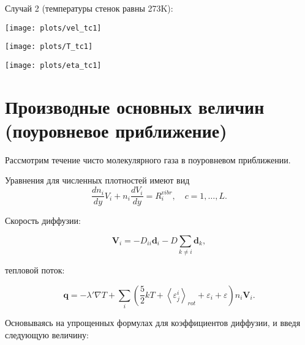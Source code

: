 \documentclass[12pt]{article}
\begin{document}
Случай 2 (температуры стенок равны 273K):
\begin{center}
\texttt{[image: plots/vel\_tc1]}
\end{center}
\begin{center}
\texttt{[image: plots/T\_tc1]}
\end{center}
\begin{center}
\texttt{[image: plots/eta\_tc1]}
\end{center}

\section{Производные основных величин (поуровневое приближение)}
Рассмотрим течение чисто молекулярного газа в поуровневом приближении.

Уравнения для численных плотностей имеют вид
\begin{equation}
  \frac{d n_{i}}{d y} V_{i} + n_{i}\frac{d V_{i}}{d y} = R_{i}^{vibr},\quad c=1,\ldots,L.\label{densityeqn-sts}
\end{equation}

Скорость диффузии:




\begin{equation}
   \mathbf{V}_{i} = -D_{ii}\mathbf{d}_{i} -D \sum_{k \neq i}\mathbf{d}_{k},
\end{equation}

тепловой поток:

\begin{equation}
  \mathbf{q} = -\lambda' \nabla T + \sum_{i} \left(\frac{5}{2}kT + \left<\varepsilon^{i}_{j} \right>_{rot} + \varepsilon_{i} + \varepsilon \right) n_{i} \mathbf{V}_{i}.
\end{equation}

Основываясь на упрощенных формулах для коэффициентов диффузии, и введя следующую величину:
\end{document}
